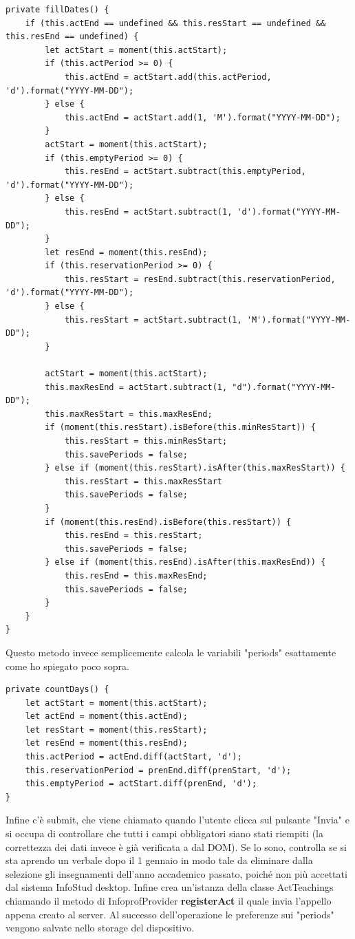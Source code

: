\documentclass[Lau, oneside, noexaminfo]{sapthesis}%
\begin{document}
\begin{lstlisting}[frame=single]
private fillDates() {
	if (this.actEnd == undefined && this.resStart == undefined && this.resEnd == undefined) {
		let actStart = moment(this.actStart);
		if (this.actPeriod >= 0) {
			this.actEnd = actStart.add(this.actPeriod, 'd').format("YYYY-MM-DD");
		} else {
			this.actEnd = actStart.add(1, 'M').format("YYYY-MM-DD");
		}
		actStart = moment(this.actStart);
		if (this.emptyPeriod >= 0) {
			this.resEnd = actStart.subtract(this.emptyPeriod, 'd').format("YYYY-MM-DD");
		} else {
			this.resEnd = actStart.subtract(1, 'd').format("YYYY-MM-DD");
		}
		let resEnd = moment(this.resEnd);
		if (this.reservationPeriod >= 0) {
			this.resStart = resEnd.subtract(this.reservationPeriod, 'd').format("YYYY-MM-DD");
		} else {
			this.resStart = actStart.subtract(1, 'M').format("YYYY-MM-DD");
		}

		actStart = moment(this.actStart);
		this.maxResEnd = actStart.subtract(1, "d").format("YYYY-MM-DD");
		this.maxResStart = this.maxResEnd;
		if (moment(this.resStart).isBefore(this.minResStart)) {
			this.resStart = this.minResStart;
			this.savePeriods = false;
		} else if (moment(this.resStart).isAfter(this.maxResStart)) {
			this.resStart = this.maxResStart
			this.savePeriods = false;
		}
		if (moment(this.resEnd).isBefore(this.resStart)) {
			this.resEnd = this.resStart;
			this.savePeriods = false;
		} else if (moment(this.resEnd).isAfter(this.maxResEnd)) {
			this.resEnd = this.maxResEnd;
			this.savePeriods = false;
		}
	}
}
\end{lstlisting}

Questo metodo invece semplicemente calcola le variabili "periods" esattamente come ho spiegato poco sopra.

\begin{lstlisting}
private countDays() {
	let actStart = moment(this.actStart);
	let actEnd = moment(this.actEnd);
	let resStart = moment(this.resStart);
	let resEnd = moment(this.resEnd);
	this.actPeriod = actEnd.diff(actStart, 'd');
	this.reservationPeriod = prenEnd.diff(prenStart, 'd');
	this.emptyPeriod = actStart.diff(prenEnd, 'd');
}
\end{lstlisting}

Infine c'è submit, che viene chiamato quando l'utente clicca sul pulsante "Invia" e si occupa di controllare che tutti i campi obbligatori siano stati riempiti (la correttezza dei dati invece è già verificata a dal DOM). Se lo sono, controlla se si sta aprendo un verbale dopo il 1 gennaio in modo tale da eliminare dalla selezione gli insegnamenti dell'anno accademico passato, poiché non più accettati dal sistema InfoStud desktop. Infine crea un'istanza della classe ActTeachings chiamando il metodo di InfoprofProvider \textbf{registerAct} il quale invia l'appello appena creato al server. Al successo dell'operazione le preferenze sui "periods" vengono salvate nello storage del dispositivo.
\end{document}

